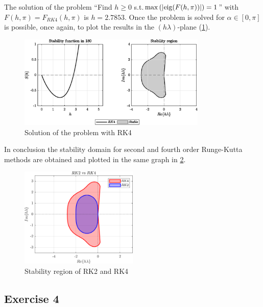 \documentclass[11pt,a4paper,oneside]{article}
\begin{document}
The solution of the problem ``Find $h\ge 0$ s.t.$\max\left(|{\rm eig}(F(h,\pi))|\right) = 1$'' with $F(h,\pi) = F_{RK4}(h,\pi)$ is $h=2.7853$.
Once the problem is solved for $\alpha\in[0, \pi]$ is possible, once again, to plot the results in the $(h\lambda)$-plane (\cref{fig:ex3_stabilityRK4}).
\begin{figure}[htb]
    \centering
    \includegraphics*[width=0.8\textwidth, keepaspectratio]{ex3_rk4.eps}
    \caption[]{\label{fig:ex3_stabilityRK4} Solution of the problem with RK4}
\end{figure}

In conclusion the stability domain for second and fourth order Runge-Kutta methods are obtained and plotted in the same graph in \cref{fig:ex3_stability}.
\begin{figure}[htb]
    \centering
    \includegraphics*[width=0.5\textwidth, keepaspectratio]{ex3_stability.png}
    \caption[]{\label{fig:ex3_stability} Stability region of RK2 and RK4}
\end{figure}

\clearpage
\subsection{Exercise 4}
\end{document}
